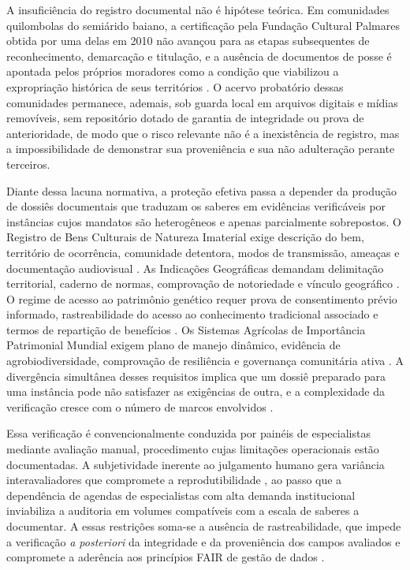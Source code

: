 \documentclass[preprint,12pt,authoryear]{elsarticle}
\begin{document}
A insuficiência do registro documental não é hipótese teórica. Em comunidades quilombolas do semiárido baiano, a certificação pela Fundação Cultural Palmares obtida por uma delas em 2010 não avançou para as etapas subsequentes de reconhecimento, demarcação e titulação, e a ausência de documentos de posse é apontada pelos próprios moradores como a condição que viabilizou a expropriação histórica de seus territórios \citep{Fernandes2013}. O acervo probatório dessas comunidades permanece, ademais, sob guarda local em arquivos digitais e mídias removíveis, sem repositório dotado de garantia de integridade ou prova de anterioridade, de modo que o risco relevante não é a inexistência de registro, mas a impossibilidade de demonstrar sua proveniência e sua não adulteração perante terceiros.

Diante dessa lacuna normativa, a proteção efetiva passa a depender da produção de dossiês documentais que traduzam os saberes em evidências verificáveis por instâncias cujos mandatos são heterogêneos e apenas parcialmente sobrepostos. O Registro de Bens Culturais de Natureza Imaterial exige descrição do bem, território de ocorrência, comunidade detentora, modos de transmissão, ameaças e documentação audiovisual \citep{IPHAN2006}. As Indicações Geográficas demandam delimitação territorial, caderno de normas, comprovação de notoriedade e vínculo geográfico \citep{Brasil1996}. O regime de acesso ao patrimônio genético requer prova de consentimento prévio informado, rastreabilidade do acesso ao conhecimento tradicional associado e termos de repartição de benefícios \citep{Brasil2015}. Os Sistemas Agrícolas de Importância Patrimonial Mundial exigem plano de manejo dinâmico, evidência de agrobiodiversidade, comprovação de resiliência e governança comunitária ativa \citep{FAO2018}. A divergência simultânea desses requisitos implica que um dossiê preparado para uma instância pode não satisfazer as exigências de outra, e a complexidade da verificação cresce com o número de marcos envolvidos \citep{BavikatteRobinson2011,Nemoga2022}.

Essa verificação é convencionalmente conduzida por painéis de especialistas mediante avaliação manual, procedimento cujas limitações operacionais estão documentadas. A subjetividade inerente ao julgamento humano gera variância interavaliadores que compromete a reprodutibilidade \citep{Braun2006}, ao passo que a dependência de agendas de especialistas com alta demanda institucional inviabiliza a auditoria em volumes compatíveis com a escala de saberes a documentar. A essas restrições soma-se a ausência de rastreabilidade, que impede a verificação \textit{a posteriori} da integridade e da proveniência dos campos avaliados e compromete a aderência aos princípios FAIR de gestão de dados \citep{Wilkinson2016}.
\end{document}
